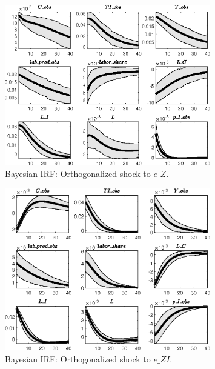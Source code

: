 
\begin{figure}[H]
\centering 
\includegraphics[width=0.80\textwidth]{two_sector_RBC_differentiated_est/Output/two_sector_RBC_differentiated_est_Bayesian_IRF_e_Z_1}
\caption{Bayesian IRF: Orthogonalized shock to $e\_Z$.}
\label{Fig:BayesianIRF:e_Z:1}
\end{figure}
 
\begin{figure}[H]
\centering 
\includegraphics[width=0.80\textwidth]{two_sector_RBC_differentiated_est/Output/two_sector_RBC_differentiated_est_Bayesian_IRF_e_ZI_1}
\caption{Bayesian IRF: Orthogonalized shock to $e\_ZI$.}
\label{Fig:BayesianIRF:e_ZI:1}
\end{figure}
 
